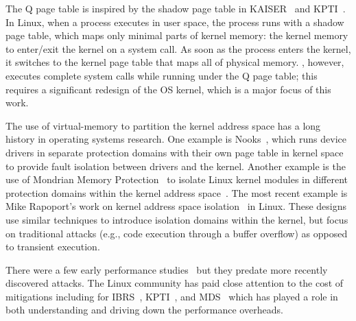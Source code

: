 The Q page table is inspired by the shadow page table in
KAISER~\cite{gruss:kaiser} and KPTI~\cite{linux:kpti}. In Linux, when
a process executes in user space, the process runs with a shadow
page table, which maps only minimal parts of kernel memory: the kernel
memory to enter/exit the kernel on a system call. As soon as the process
enters the kernel, it switches to the kernel page table that maps all
of physical memory.  \sys, however, executes complete system
calls while running under the Q page table; this requires a significant
redesign of the OS kernel, which is a major focus of this work.

The use of virtual-memory to partition the kernel address space has a
long history in operating systems research.  One example is
Nooks~\cite{swift:nooks-tocs}, which runs device drivers in separate
protection domains with their own page table in kernel space to
provide fault isolation between drivers and the kernel.  Another
example is the use of Mondrian Memory Protection~\cite{witchel:mmp} to
isolate Linux kernel modules in different protection domains within
the kernel address space~\cite{witchel:mondrix}.  The most
recent example is Mike Rapoport's work on kernel address space
isolation~\cite{lwn:beyond-kpti} in Linux.  These designs use similar
techniques to introduce isolation domains within the kernel, but focus
on traditional attacks (e.g., code execution through a buffer overflow)
as opposed to transient execution.



There were a few early performance studies~\cite{nikolay:meltdown-spectre-performance,prout:measuring-spectre-meltdown} but they predate more recently discovered attacks.
The Linux community has paid close attention to the cost of mitigations including for IBRS~\cite{linus:ibrs-rant},  KPTI~\cite{gregg:kpti-perfromance}, and MDS~\cite{larabel:perf-zombieload} which has played a role in both understanding and driving down the performance overheads.




